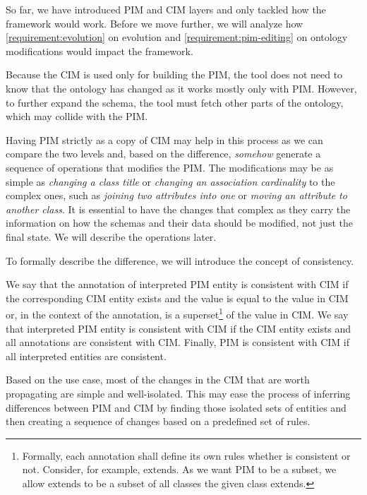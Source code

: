 So far, we have introduced PIM and CIM layers and only tackled how the framework would work. Before we move further, we will analyze how \autoref{requirement:evolution} on evolution and \ref{requirement:pim-editing} on ontology modifications would impact the framework.

Because the CIM is used only for building the PIM, the tool does not need to know that the ontology has changed as it works mostly only with PIM. However, to further expand the schema, the tool must fetch other parts of the ontology, which may collide with the PIM.

Having PIM strictly as a copy of CIM may help in this process as we can compare the two levels and, based on the difference, \textit{somehow} generate a sequence of operations that modifies the PIM. The modifications may be as simple as \textit{changing a class title} or \textit{changing an association cardinality} to the complex ones, such as \textit{joining two attributes into one} or \textit{moving an attribute to another class}. It is essential to have the changes that complex as they carry the information on how the schemas and their data should be modified, not just the final state. We will describe the operations later.

To formally describe the difference, we will introduce the concept of consistency.

\begin{definition}[consistency]
    We say that the annotation of interpreted PIM entity is consistent with CIM if the corresponding CIM entity exists and the value is equal to the value in CIM or, in the context of the annotation, is a superset\footnote{Formally, each annotation shall define its own rules whether is consistent or not. Consider, for example, $\textrm{extends}$. As we want PIM to be a subset, we allow $\textrm{extends}$ to be a subset of all classes the given class extends.} of the value in CIM. We say that {interpreted PIM entity is consistent with CIM} if the CIM entity exists and all annotations are consistent with CIM. Finally, {PIM is consistent with CIM} if all interpreted entities are consistent.
\end{definition}

Based on the use case, most of the changes in the CIM that are worth propagating are simple and well-isolated. This may ease the process of inferring differences between PIM and CIM by finding those isolated sets of entities and then creating a sequence of changes based on a predefined set of rules.

